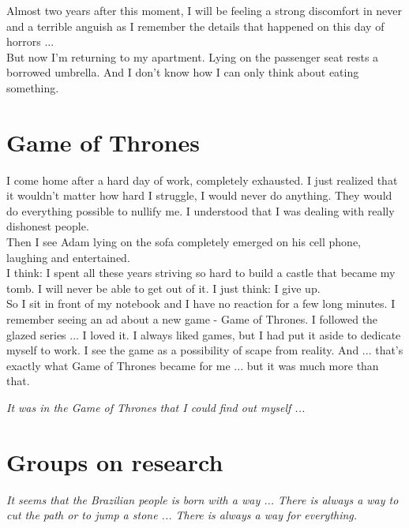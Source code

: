 \documentclass[11pt]{book}
\begin{document}
\noindent Almost two years after this moment, I will be feeling a strong discomfort in never and a terrible anguish as I remember the details that happened on this day of horrors ... \\

\noindent But now I'm returning to my apartment. Lying on the passenger seat rests a borrowed umbrella. And I don't know how I can only think about eating something. \\

\chapter{Game of Thrones}

\noindent I come home after a hard day of work, completely exhausted. I just realized that it wouldn't matter how hard I struggle, I would never do anything. They would do everything possible to nullify me. I understood that I was dealing with really dishonest people. \\

\noindent Then I see Adam lying on the sofa completely emerged on his cell phone, laughing and entertained. \\

\noindent I think: I spent all these years striving so hard to build a castle that became my tomb. I will never be able to get out of it. I just think: I give up. \\

\noindent So I sit in front of my notebook and I have no reaction for a few long minutes. I remember seeing an ad about a new game - Game of Thrones. I followed the glazed series ... I loved it. I always liked games, but I had put it aside to dedicate myself to work. I see the game as a possibility of scape from reality. And ... that's exactly what Game of Thrones became for me ... but it was much more than that. \\

\noindent \begin{center} \emph{It was in the Game of Thrones that I could find out myself ...} \end{center} 

\chapter{Groups on research}

\noindent \begin{center} \emph{It seems that the Brazilian people is born with a way ... There is always a way to cut the path or to jump a stone ... There is always a way for everything.} \end{center} 
\end{document}
